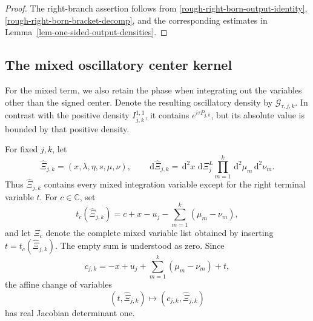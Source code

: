 \documentclass[a4paper,11pt]{article}
\newcommand{\C}{\mathbb{C}}
\newcommand{\dd}{\,\text{d}}
\theoremstyle{plain}
\theoremstyle{definition}
\theoremstyle{remark}
\begin{document}
\begin{proof}
The right-branch assertion follows from \eqref{rough-right-born-output-identity}, \eqref{rough-right-born-bracket-decomp}, and the corresponding estimates in Lemma~\ref{lem-one-sided-output-densities}.
\end{proof}


\subsection{The mixed oscillatory center kernel}

For the mixed term, we also retain the phase when integrating out the variables other than the signed center. Denote the resulting oscillatory density by $\mathcal G_{\tau,j,k}$. In contrast with the positive density $I_{j,k}^{1,1}$, it contains $e^{i\tau P_{j,k}}$, but its absolute value is bounded by that positive density.

For fixed $j,k$, let
\begin{equation}\label{rough-center-hat-variables}
 \widehat\Xi_{j,k}
 =(x,\lambda,\eta,s,\mu,\nu),
 \qquad
 \dd\widehat\Xi_{j,k}
 =\dd^2x\,\dd\Xi_j^L
   \prod_{m=1}^k\dd^2\mu_m\dd^2\nu_m.
\end{equation}
Thus $\widehat\Xi_{j,k}$ contains every mixed integration variable except
for the right terminal variable $t$.  For $c\in\C$, set
\begin{equation}\label{rough-center-terminal-substitution}
 t_c(\widehat\Xi_{j,k})
 =c+x-u_j-\sum_{m=1}^k(\mu_m-\nu_m),
\end{equation}
and let $\Xi_c$ denote the complete mixed variable list obtained by inserting
$t=t_c(\widehat\Xi_{j,k})$.  The empty sum is understood as zero.  Since
\[
 c_{j,k}
 =-x+u_j+\sum_{m=1}^k(\mu_m-\nu_m)+t,
\]
the affine change of variables
\begin{equation}\label{rough-center-change-variables}
 (t,\widehat\Xi_{j,k})
 \longmapsto(c_{j,k},\widehat\Xi_{j,k})
\end{equation}
has real Jacobian determinant one.
\end{document}
